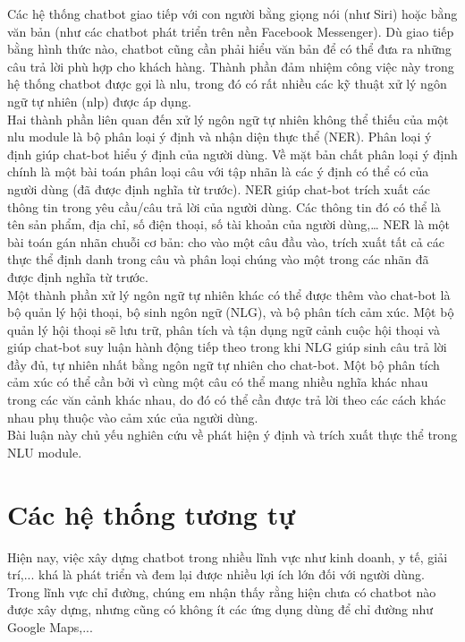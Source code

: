 Các hệ thống chatbot giao tiếp với con người bằng giọng nói (như Siri) hoặc bằng văn bản (như các chatbot phát triển trên nền Facebook Messenger). Dù giao tiếp bằng hình thức nào, chatbot cũng cần phải hiểu văn bản để có thể đưa ra những câu trả lời phù hợp cho khách hàng. Thành phần đảm nhiệm công việc này trong hệ thống chatbot được gọi là \ac{nlu}, trong đó có rất nhiều các kỹ thuật xử lý ngôn ngữ tự nhiên (\ac{nlp}) được áp dụng.
\\
Hai thành phần liên quan đến xử lý ngôn ngữ tự nhiên không thể thiếu của một \ac{nlu} module là bộ phân loại ý định và nhận diện thực thể (NER). Phân loại ý định giúp chat-bot hiểu ý định của người dùng. Về mặt bản chất phân loại ý định chính là một bài toán phân loại câu với tập nhãn là các ý định có thể có của người dùng (đã được định nghĩa từ trước). NER giúp chat-bot trích xuất các thông tin trong yêu cầu/câu trả lời của người dùng. Các thông tin đó có thể là tên sản phẩm, địa chỉ, số điện thoại, số tài khoản của người dùng,… NER là một bài toán gán nhãn chuỗi cơ bản: cho vào một câu đầu vào, trích xuất tất cả các thực thể định danh trong câu và phân loại chúng vào một trong các nhãn đã được định nghĩa từ trước.
\\
Một thành phần xử lý ngôn ngữ tự nhiên khác có thể được thêm vào chat-bot là bộ quản lý hội thoại, bộ sinh ngôn ngữ (NLG), và bộ phân tích cảm xúc. Một bộ quản lý hội thoại sẽ lưu trữ, phân tích và tận dụng ngữ cảnh cuộc hội thoại và giúp chat-bot suy luận hành động tiếp theo trong khi NLG giúp sinh câu trả lời đầy đủ, tự nhiên nhất bằng ngôn ngữ tự nhiên cho chat-bot. Một bộ phân tích cảm xúc có thể cần bởi vì cùng một câu có thể mang nhiều nghĩa khác nhau trong các văn cảnh khác nhau, do đó có thể cần được trả lời theo các cách khác nhau phụ thuộc vào cảm xúc của người dùng.
\\
Bài luận này chủ yếu nghiên cứu về phát hiện ý định và trích xuất thực thể trong NLU module.

\section{Các hệ thống tương tự}

Hiện nay, việc xây dựng chatbot trong nhiều lĩnh vực như kinh doanh, y tế, giải trí,... khá là phát triển và đem lại được nhiều lợi ích lớn đối với người dùng. Trong lĩnh vực chỉ đường, chúng em nhận thấy rằng hiện chưa có chatbot nào được xây dựng, nhưng cũng có không ít các ứng dụng dùng để chỉ đường như Google Maps\cite{ggmaps},...

